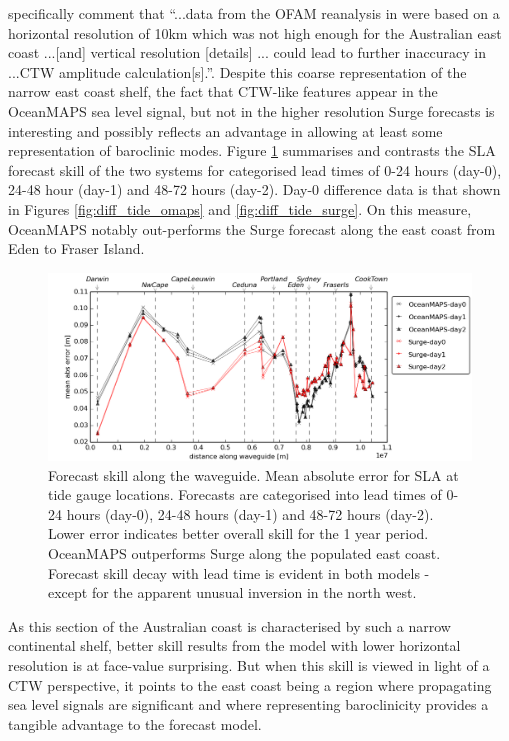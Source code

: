 \citet[p.312]{Liao:2018jd} specifically comment that ``...data from the OFAM reanalysis in \citet{Woodham:2013cl} were based on a horizontal resolution of 10km which was not high enough for the Australian east coast ...[and] vertical resolution [details] ... could lead to further inaccuracy in ...CTW amplitude calculation[s].''.
Despite this coarse representation of the narrow east coast shelf, the fact that CTW-like features appear in the OceanMAPS sea level signal, but not in the higher resolution Surge forecasts is interesting and possibly reflects an advantage in allowing at least some representation of baroclinic modes.   
Figure \ref{fig:skill_mebs} summarises and contrasts the SLA forecast skill of the two systems for categorised lead times of 0-24 hours (day-0), 24-48 hour (day-1) and 48-72 hours (day-2).  Day-0 difference data is that shown in Figures \ref{fig:diff_tide_omaps} and \ref{fig:diff_tide_surge}.
On this measure, OceanMAPS notably out-performs the Surge forecast along the east coast from Eden to Fraser Island.
\begin{figure}[H]\centering
    \noindent\includegraphics[width=\figwidthFull]{figures/plots/plot_skill_path_mebs.png}
    \caption[Forecast skill along the waveguide.]
            {Forecast skill along the waveguide. Mean absolute error for SLA at tide gauge locations. Forecasts are categorised into lead times of 0-24 hours (day-0), 24-48 hours (day-1) and 48-72 hours (day-2).  
            Lower error indicates better overall skill for the 1 year period.
            OceanMAPS outperforms Surge along the populated east coast.
            Forecast skill decay with lead time is evident in both models - except for the apparent unusual inversion in the north west.}
    \label{fig:skill_mebs}
\end{figure}
As this section of the Australian coast is characterised by such a narrow continental shelf, better skill results from the model with lower horizontal resolution is at face-value surprising.  But when this skill is viewed in light of a CTW perspective, it points to the east coast being a region where  propagating sea level signals are significant and where representing baroclinicity provides a tangible advantage to the forecast model.

